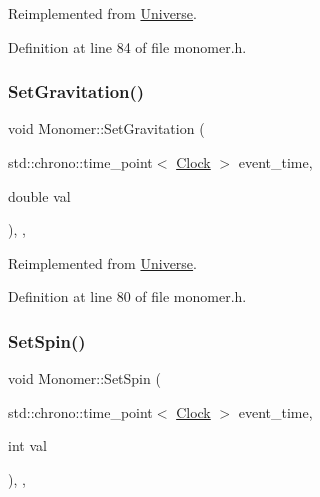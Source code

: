 Reimplemented from \hyperlink{class_universe_a608aa95698380f791a0ffba45cc1bee3}{Universe}.



Definition at line 84 of file monomer.\+h.

\mbox{\label{class_monomer_ab38d44b27a46d5630aeb5e889f927c09}} 
\subsubsection{\texorpdfstring{Set\+Gravitation()}{SetGravitation()}}
{\footnotesize\ttfamily void Monomer\+::\+Set\+Gravitation (\begin{DoxyParamCaption}\item[{std\+::chrono\+::time\+\_\+point$<$ \hyperlink{universe_8h_a0ef8d951d1ca5ab3cfaf7ab4c7a6fd80}{Clock} $>$}]{event\+\_\+time,  }\item[{double}]{val }\end{DoxyParamCaption})\hspace{0.3cm}{\ttfamily [inline]}, {\ttfamily [final]}, {\ttfamily [virtual]}}



Reimplemented from \hyperlink{class_universe_ae0cb8d86b2fbb8396d605160344b42f5}{Universe}.



Definition at line 80 of file monomer.\+h.

\mbox{\label{class_monomer_ad24a86a4c1ac62d1b0ce8040d6b08adf}} 
\subsubsection{\texorpdfstring{Set\+Spin()}{SetSpin()}}
{\footnotesize\ttfamily void Monomer\+::\+Set\+Spin (\begin{DoxyParamCaption}\item[{std\+::chrono\+::time\+\_\+point$<$ \hyperlink{universe_8h_a0ef8d951d1ca5ab3cfaf7ab4c7a6fd80}{Clock} $>$}]{event\+\_\+time,  }\item[{int}]{val }\end{DoxyParamCaption})\hspace{0.3cm}{\ttfamily [inline]}, {\ttfamily [final]}, {\ttfamily [virtual]}}



